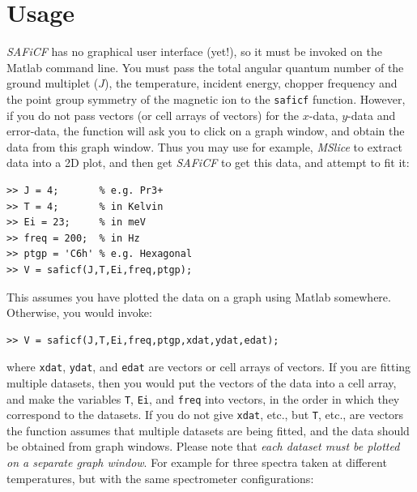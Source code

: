 \documentclass[12pt,onecolumn,tightenlines,aps,amsmath,floatfix,notitlepage,nofootinbib]{revtex4}
\begin{document}




\section{Usage} \label{sec-use}

\emph{SAFiCF} has no graphical user interface (yet!), so it must be invoked on the Matlab command line. You must pass the total angular quantum number of the ground multiplet ($J$), the temperature, incident energy, chopper frequency and the point group symmetry of the magnetic ion to the \texttt{saficf} function. However, if you do not pass vectors (or cell arrays of vectors) for the $x$-data, $y$-data and error-data, the function will ask you to click on a graph window, and obtain the data from this graph window. Thus you may use for example, \emph{MSlice} to extract data into a 2D plot, and then get \emph{SAFiCF} to get this data, and attempt to fit it:

\begin{verbatim}
>> J = 4;       % e.g. Pr3+
>> T = 4;       % in Kelvin
>> Ei = 23;     % in meV
>> freq = 200;  % in Hz
>> ptgp = 'C6h' % e.g. Hexagonal
>> V = saficf(J,T,Ei,freq,ptgp);
\end{verbatim}

\noindent This assumes you have plotted the data on a graph using Matlab somewhere. Otherwise, you would invoke:

\begin{verbatim}
>> V = saficf(J,T,Ei,freq,ptgp,xdat,ydat,edat);
\end{verbatim}

\noindent where \texttt{xdat}, \texttt{ydat}, and \texttt{edat} are vectors or cell arrays of vectors. If you are fitting multiple datasets, then you would put the vectors of the data into a cell array, and make the variables \texttt{T}, \texttt{Ei}, and \texttt{freq} into vectors, in the order in which they correspond to the datasets. If you do not give \texttt{xdat}, etc., but \texttt{T}, etc., are vectors the function assumes that multiple datasets are being fitted, and the data should be obtained from graph windows. Please note that \emph{each dataset must be plotted on a separate graph window}. For example for three spectra taken at different temperatures, but with the same spectrometer configurations:
\end{document}
